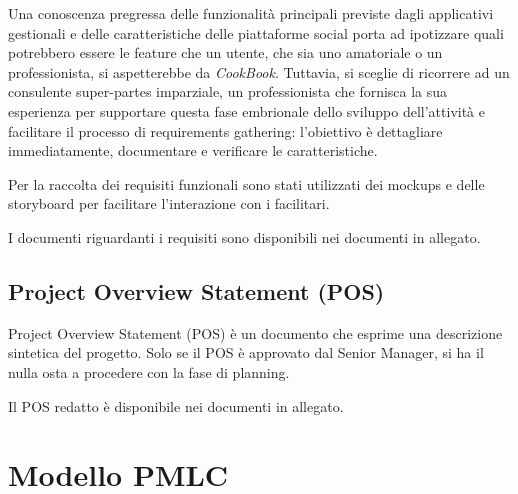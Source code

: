 Una conoscenza pregressa delle funzionalità principali previste dagli applicativi gestionali e delle caratteristiche delle piattaforme social porta ad 
ipotizzare quali potrebbero essere le feature che un utente, che sia uno amatoriale o un professionista, si aspetterebbe da \textit{CookBook}.
Tuttavia, si sceglie di ricorrere ad un consulente super-partes imparziale, un professionista che fornisca la sua esperienza per supportare questa fase 
embrionale dello sviluppo dell'attività e facilitare il processo di requirements gathering: l'obiettivo è dettagliare immediatamente, documentare e verificare le caratteristiche.

Per la raccolta dei requisiti funzionali sono stati utilizzati dei mockups e delle storyboard per facilitare l'interazione con i facilitari.

I documenti riguardanti i requisiti sono disponibili nei documenti in allegato.

\subsection{Project Overview Statement (POS)}

Project Overview Statement (POS) è un documento che esprime una descrizione sintetica del progetto.
Solo se il POS è approvato dal Senior Manager, si ha il nulla osta a procedere con la fase di planning.

Il POS redatto è disponibile nei documenti in allegato.


\section{Modello PMLC}
